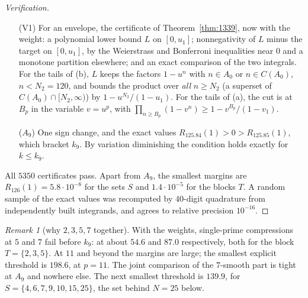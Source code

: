 \documentclass[11pt]{article}
\theoremstyle{remark}
\newtheorem{remark}[theorem]{Remark}
\begin{document}
\begin{proof}[Verification]
\begin{itemize}
that $D$ is positive on $(0,1)$ or has one sign change there, from $+$ to $-$. In the latter case
$R_{126}(1)=\sum_ng_n\,126/(126+n)$ is computed exactly and is positive. By variation diminishing
the running-integral condition then holds for all $0<k\le126$.
\item[(V1)] For an envelope, the certificate of Theorem~\ref{thm:1339}, now with the weight: a
polynomial lower bound $L$ on $[0,u_1]$; nonnegativity of $L$ minus the target on $[0,u_1]$, by
the Weierstrass and Bonferroni inequalities near $0$ and a monotone partition elsewhere; and an
exact comparison of the two integrals. For the tails of (b), $L$ keeps the factors $1-u^n$ with
$n\in A_0$ or $n\in C(A_0)$, $n<N_2=120$, and bounds the product over \emph{all} $n\ge N_2$ (a
superset of $C(A_0)\cap[N_2,\infty)$) by $1-u^{N_2}/(1-u_1)$. For the tails of (a), the cut is at
$B_p$ in the variable $v=u^p$, with $\prod_{n\ge B_p}(1-v^n)\ge1-v^{B_p}/(1-v_1)$.
\item[($A_9$)] One sign change, and the exact values $R_{125.84}(1)>0>R_{125.85}(1)$, which bracket
$k_9$. By variation diminishing the condition holds exactly for $k\le k_9$.
\end{itemize}
All $5350$ certificates pass. Apart from $A_9$, the smallest margins are
$R_{126}(1)=5.8\cdot10^{-8}$ for the sets $S$ and $1.4\cdot10^{-5}$ for the blocks $T$. A random
sample of the exact values was recomputed by $40$-digit quadrature from independently built
integrands, and agrees to relative precision $10^{-16}$.
\end{proof}

\begin{remark}[why $2,3,5,7$ together]
With the weights, single-prime compressions at $5$ and $7$ fail before $k_9$: at about $54.6$
and $87.0$ respectively, both for the block $T=\{2,3,5\}$. At $11$ and beyond the margins are
large; the smallest explicit threshold is $198.6$, at $p=11$. The joint comparison of the
$7$-smooth part is tight at $A_9$ and nowhere else. The next smallest threshold is $139.9$, for
$S=\{4,6,7,9,10,15,25\}$, the set behind $N=25$ below.
\end{remark}
\end{document}
